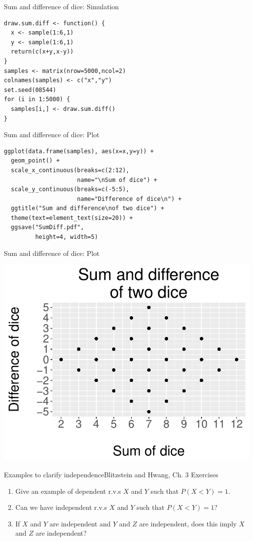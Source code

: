 \documentclass{beamer}
\begin{document}
\begin{frame}[fragile]{Sum and difference of dice: Simulation}
\pause
\begin{verbatim}
draw.sum.diff <- function() {
  x <- sample(1:6,1)
  y <- sample(1:6,1)
  return(c(x+y,x-y))
}
samples <- matrix(nrow=5000,ncol=2)
colnames(samples) <- c("x","y")
set.seed(08544)
for (i in 1:5000) {
  samples[i,] <- draw.sum.diff()
}
\end{verbatim}
\end{frame}

\begin{frame}[fragile]{Sum and difference of dice: Plot}
\pause
\begin{verbatim}
ggplot(data.frame(samples), aes(x=x,y=y)) +
  geom_point() +
  scale_x_continuous(breaks=c(2:12),
                     name="\nSum of dice") +
  scale_y_continuous(breaks=c(-5:5),
                     name="Difference of dice\n") +
  ggtitle("Sum and difference\nof two dice") +
  theme(text=element_text(size=20)) +
  ggsave("SumDiff.pdf",
         height=4, width=5)
\end{verbatim}
\end{frame}

\begin{frame}[fragile]{Sum and difference of dice: Plot}
\begin{center}\includegraphics[scale=.7]{figures/SumDiff.pdf}\end{center}
\end{frame}

\begin{frame}{Examples to clarify independence}{Blitzstein and Hwang, Ch. 3 Exercises}
\begin{enumerate}
\item Give an example of dependent r.v.s $X$ and $Y$ such that $P(X<Y)=1$.
\item Can we have independent r.v.s $X$ and $Y$ such that $P(X<Y)=1$?
\item If $X$ and $Y$ are independent and $Y$ and $Z$ are independent, does this imply $X$ and $Z$ are independent?
\end{enumerate}
\end{frame}
\end{document}
